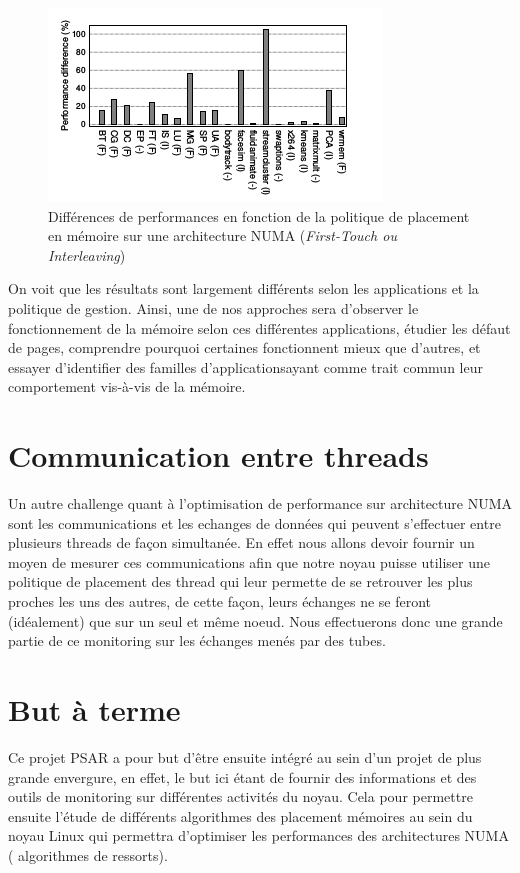     \begin{figure}[!ht]
      \centering
      \includegraphics[scale=0.80]{img/numa_memory_policy}
      \caption{Différences de performances en fonction de la politique de
        placement en mémoire sur une architecture NUMA (\textit{First-Touch ou Interleaving})}
    \end{figure}

    On voit que les résultats sont largement différents selon les applications
    et la politique de gestion. Ainsi, une de nos approches sera d'observer le
    fonctionnement de la mémoire selon ces différentes applications, étudier les
    défaut de pages, comprendre pourquoi certaines fonctionnent mieux que
    d'autres, et essayer d'identifier des \og familles d'applications\fg ayant
    comme trait commun leur comportement vis-à-vis de la mémoire.
    
  \section{Communication entre threads}
    
    Un autre challenge quant à l'optimisation de performance sur architecture 
    NUMA sont les communications et les echanges de données qui peuvent s'effectuer 
    entre 
    plusieurs threads de façon simultanée. En effet nous allons devoir fournir un 
    moyen
    de mesurer ces communications afin que notre noyau 
    puisse utiliser une politique de placement des thread qui leur permette de 
    se retrouver les plus proches les uns des autres, de cette façon, leurs échanges 
    ne se feront (idéalement) que sur un seul et même noeud. Nous effectuerons donc
    une grande partie de ce monitoring sur les échanges menés par des tubes.

  \section{But à terme}

    Ce projet PSAR a pour but d'être ensuite intégré au sein d'un projet de plus
     grande 
    envergure, en effet, le but ici étant de fournir des informations et des outils
    de monitoring sur différentes activités du noyau. Cela pour permettre ensuite 
    l'étude de différents algorithmes des placement mémoires au sein du noyau Linux
    qui permettra d'optimiser les performances des architectures NUMA (
    algorithmes de \og ressorts\fg).
